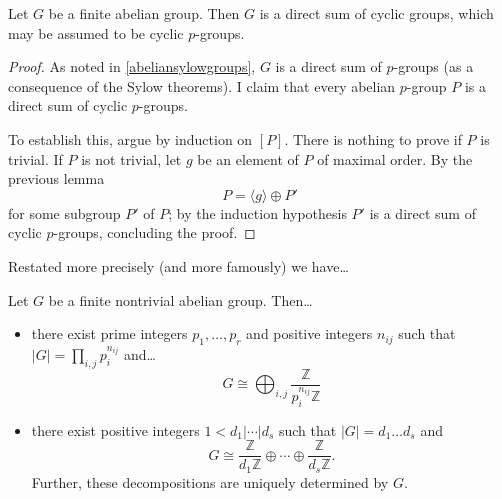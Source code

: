 \begin{corollary}
Let $G$ be a finite abelian group. Then $G$ is a direct sum of cyclic groups, which may be assumed to be cyclic $p$-groups.
\end{corollary}

\begin{proof}
As noted in \ref{abeliansylowgroups}, $G$ is a direct sum of $p$-groups (as a consequence of the Sylow theorems). I claim that every abelian $p$-group $P$ is a direct sum of cyclic $p$-groups.

To establish this, argue by induction on $[P]$. There is nothing to prove if $P$ is trivial. If $P$ is not trivial, let $g$ be an element of $P$ of maximal order. By the previous lemma
$$P =\langle g \rangle \oplus P'$$
for some subgroup $P'$ of $P$; by the induction hypothesis $P'$ is a direct sum of cyclic $p$-groups, concluding the proof.
\end{proof}

\noindent Restated more precisely (and more famously) we have\dots

\begin{theorem}
\label{finiteabelianclassificationtheorem}
Let $G$ be a finite nontrivial abelian group. Then\dots
\begin{itemize}
  \item there exist prime integers $p_1, \dots, p_r$ and positive integers $n_{ij}$ such that $|G| = \prod_{i,j} p_i^{n_{ij}}$ and\dots
  $$G \cong \bigoplus_{i,j} \frac{\mathbb{Z}}{p_i^{n_{ij}}\mathbb{Z}}$$
  \item there exist positive integers $1 < d_1 | \cdots | d_s$ such that $|G| = d_1 \dots d_s$ and
  $$G \cong \frac{\mathbb{Z}}{d_1\mathbb{Z}}\oplus \cdots \oplus \frac{\mathbb{Z}}{d_s\mathbb{Z}}.$$
  Further, these decompositions are uniquely determined by $G$.
\end{itemize}
\end{theorem}